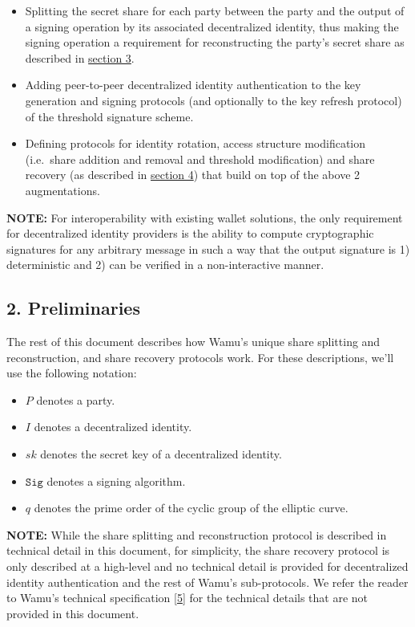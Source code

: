 \documentclass[
]{article}
\providecommand{\tightlist}{%
  \setlength{\itemsep}{0pt}\setlength{\parskip}{0pt}}
\begin{document}
\begin{itemize}
\tightlist
\item
  Splitting the secret share for each party between the party and the
  output of a signing operation by its associated decentralized
  identity, thus making the signing operation a requirement for
  reconstructing the party's secret share as described in
  \protect\hyperlink{share-splitting-and-reconstruction}{section 3}.
\item
  Adding peer-to-peer decentralized identity authentication to the key
  generation and signing protocols (and optionally to the key refresh
  protocol) of the threshold signature scheme.
\item
  Defining protocols for identity rotation, access structure
  modification (i.e.~share addition and removal and threshold
  modification) and share recovery (as described in
  \protect\hyperlink{share-recovery}{section 4}) that build on top of
  the above 2 augmentations.
\end{itemize}

\textbf{NOTE:} For interoperability with existing wallet solutions, the
only requirement for decentralized identity providers is the ability to
compute cryptographic signatures for any arbitrary message in such a way
that the output signature is 1) deterministic and 2) can be verified in
a non-interactive manner.

\hypertarget{preliminaries}{%
\subsection{2. Preliminaries}\label{preliminaries}}

The rest of this document describes how Wamu's unique share splitting
and reconstruction, and share recovery protocols work. For these
descriptions, we'll use the following notation:

\begin{itemize}
\tightlist
\item
  \(P\) denotes a party.
\item
  \(I\) denotes a decentralized identity.
\item
  \(sk\) denotes the secret key of a decentralized identity.
\item
  \(\mathtt{Sig}\) denotes a signing algorithm.
\item
  \(q\) denotes the prime order of the cyclic group of the elliptic
  curve.
\end{itemize}

\textbf{NOTE:} While the share splitting and reconstruction protocol is
described in technical detail in this document, for simplicity, the
share recovery protocol is only described at a high-level and no
technical detail is provided for decentralized identity authentication
and the rest of Wamu's sub-protocols. We refer the reader to Wamu's
technical specification {[}\protect\hyperlink{ref-wamu}{5}{]} for the
technical details that are not provided in this document.
\end{document}
